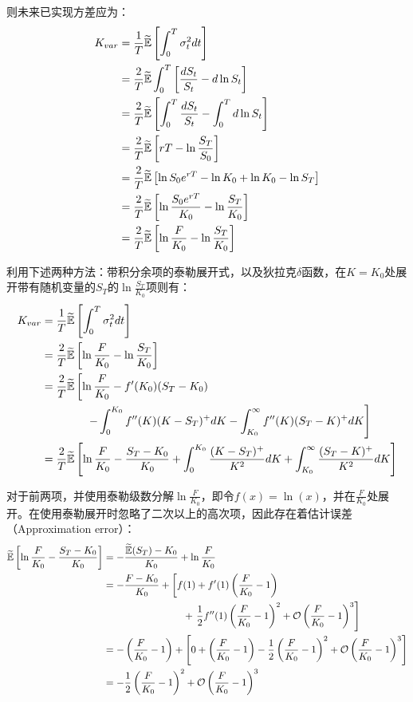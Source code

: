 \documentclass[11pt]{article}
\begin{document}
则未来已实现方差应为：
\begin{align*}
    K_{var} &= \frac{1}{T} \widetilde{\mathbb{E}} \left[ \int^T_0 \sigma^2_t dt \right] \\
    &= \frac{2}{T} \widetilde{\mathbb{E}} \int^T_0 \left[ \frac{d S_t}{S_t} - d \ln S_t \right] \\
    &= \frac{2}{T} \widetilde{\mathbb{E}} \left[ \int^T_0 \frac{d S_t}{S_t} - \int^T_0 d \ln S_t \right] \\
    &= \frac{2}{T} \widetilde{\mathbb{E}} \left[ rT  - \ln \frac{S_T}{S_0} \right] \\
    &= \frac{2}{T} \widetilde{\mathbb{E}} \left[ \ln S_0 e^{rT} -\ln K_0 + \ln K_0 - \ln S_T \right] \\
    &= \frac{2}{T} \widetilde{\mathbb{E}} \left[ \ln \frac{S_0 e^{rT}}{K_0} - \ln \frac{S_T}{K_0} \right] \\
    &= \frac{2}{T} \widetilde{\mathbb{E}} \left[ \ln \frac{F}{K_0} - \ln \frac{S_T}{K_0} \right]
\end{align*}

利用下述两种方法：带积分余项的泰勒展开式，以及狄拉克$\delta$函数，在$K=K_0$处展开带有随机变量的$S_T$的$\ln\frac{S_T}{K_0}$项则有：
\begin{align*}
    K_{var} &=  \frac{1}{T} \widetilde{\mathbb{E}} \left[ \int^T_0 \sigma^2_t dt \right] \\
    &= \frac{2}{T} \widetilde{\mathbb{E}} \left[\ln\frac{F}{K_0} - \ln\frac{S_T}{K_0}  \right] \\
    &= \frac{2}{T} \widetilde{\mathbb{E}} \left[ \ln\frac{F}{K_0}- f'(K_0) (S_T-K_0) \right. \\
    &\hspace{4em} \left. - \int^{K_0}_{0} f''(K) (K-S_T)^+ dK - \int^{\infty}_{K_0} f''(K) (S_T-K)^+ dK  \right] \\
    &= \frac{2}{T} \widetilde{\mathbb{E}} \left[ \ln\frac{F}{K_0} - \frac{S_T-K_0}{K_0} + \int^{K_0}_{0} \frac{(K-S_T)^+}{K^2} dK + \int^{\infty}_{K_0} \frac{(S_T-K)^+}{K^2} dK \right]
\end{align*}

对于前两项，并使用泰勒级数分解$\ln \frac{F}{K_0}$，即令$f(x) = \ln(x)$，并在$\frac{F}{K_0}$处展开。在使用泰勒展开时忽略了二次以上的高次项，因此存在着估计误差（Approximation error）：
\begin{align*}
    \widetilde{\mathbb{E}} \left[ \ln\frac{F}{K_0} - \frac{S_T-K_0}{K_0} \right]
    &= -\frac{\widetilde{\mathbb{E}}(S_T)-K_0}{K_0} + \ln \frac{F}{K_0} \\
    &= -\frac{F-K_0}{K_0} + \left[ f(1) + f'(1)\left(\frac{F}{K_0}-1\right) \right. \\
    &\hspace{8em} + \left. \frac{1}{2}f''(1)\left(\frac{F}{K_0}-1\right)^2 + \mathcal{O}\left( \frac{F}{K_0} - 1 \right)^3 \right] \\
    &= - \left( \frac{F}{K_0} -1 \right) + \left[ 0 + \left(\frac{F}{K_0} - 1\right) - \frac{1}{2} \left(\frac{F}{K_0} - 1\right)^2 + \mathcal{O}\left( \frac{F}{K_0} - 1 \right)^3 \right] \\
    &= - \frac{1}{2} \left(\frac{F}{K_0} - 1\right)^2 + \mathcal{O}\left( \frac{F}{K_0} - 1 \right)^3
\end{align*}
\end{document}
